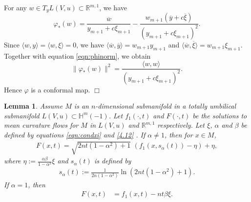 \documentclass[12pt]{article}
\newtheorem{lem}{Lemma}[section]
\begin{document}
For any $w \in T_y L(V, u) \subset \mathbb{R}^{m,1}$, we have
\[ \varphi_*(w) = \frac{\overline{w}}{y_{m+1}+c\xi_{m+1}} -
     \frac{w_{m+1}(\overline{y}+c\overline{\xi})}{(y_{m+1}+c\xi_{m+1})^2}.\]
Since $\langle w, y\rangle=\langle w, \xi\rangle=0$, we have
$\langle\overline{w}, \overline{y}\rangle = w_{m+1}y_{m+1}$ and $\langle\overline{w}, \overline{\xi}\rangle = w_{m+1} \xi_{m+1}$.
Together with equation \eqref{eqn:phinorm}, we obtain
\[ \|\varphi_*(w)\|^2 =  \frac{\langle w, w\rangle}{(y_{m+1}+c\xi_{m+1})^2}.\]
Hence $\varphi$ is a conformal map.
$\Box$


\begin{lem} \label{F'formula}
Assume $M$  is an $n$-dimensional  submanifold in a totally umbilical submanifold $L(V, u) \subset \mathbb H^{m}(-1)$.
Let $f_1(\cdot,t)$ and $F(\cdot,t)$ be the solutions to  mean curvature flows for $M$ in $L(V,u)$ and  $\mathbb R^{m,1}$ respectively. Let $\xi$, $\alpha$ and $\beta$  be defined by equations \eqref{eqn:condxi} and \eqref{4.12} .
If $\alpha\neq 1$, then for $x\in M$,
	\begin{align}
		F(x,t)=\sqrt{2nt(1-\alpha^2)+1}\, \, (f_1(x,s_{\alpha}(t))-\eta)+\eta,  \label{9.1.5}
	\end{align}
	where $\eta := \frac{\alpha\beta}{1-\alpha^2}\xi$ and  $s_{\alpha}(t)$ is defined by
	\begin{align} \label{eqn:st}
		 	s_{\alpha}(t) :=
		 	\frac{1}{2n(1-\alpha^2)}\ln (2nt(1-\alpha^2)+1).
     \end{align}
If $\alpha=1$, then
\begin{align}
		  	 F(x,t)&=f_1(x,t)-  nt  \beta \xi .  \label{9.1.6}
		  \end{align}
\end{lem}
\end{document}

